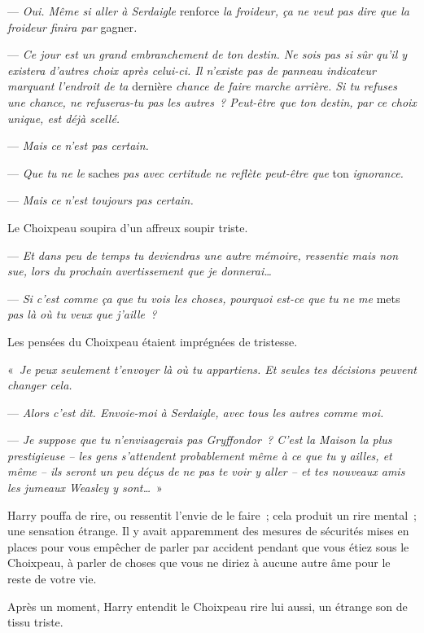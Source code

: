 --- \emph{Oui. Même si aller à Serdaigle} renforce \emph{la froideur, ça ne veut pas dire que la froideur finira par} gagner\emph{.}

--- \emph{Ce jour est un grand embranchement de ton destin. Ne sois pas si sûr qu'il y existera d'autres choix après celui-ci. Il n'existe pas de panneau indicateur marquant l'endroit de ta} dernière \emph{chance de faire marche arrière. Si tu refuses une chance, ne refuseras-tu pas les autres~? Peut-être que ton destin, par ce choix unique, est déjà scellé.}

--- \emph{Mais ce n'est pas certain.}

--- \emph{Que tu ne le} saches \emph{pas avec certitude ne reflète peut-être que} ton \emph{ignorance.}

--- \emph{Mais ce n'est toujours pas certain.}

Le Choixpeau soupira d'un affreux soupir triste.

--- \emph{Et dans peu de temps tu deviendras une autre mémoire, ressentie mais non sue, lors du prochain avertissement que je donnerai…}

--- \emph{Si c'est comme ça que tu vois les choses, pourquoi est-ce que tu ne me} mets \emph{pas là où tu veux que j'aille~?}

Les pensées du Choixpeau étaient imprégnées de tristesse.

«~\emph{Je peux seulement t'envoyer là où tu appartiens. Et seules tes décisions peuvent changer cela.}

--- \emph{Alors c'est dit. Envoie-moi à Serdaigle,  avec tous les autres comme moi.}

--- \emph{Je suppose que tu n'envisagerais pas Gryffondor~? C'est la Maison la plus prestigieuse -- les gens s'attendent probablement même à ce que tu y ailles, et même -- ils seront un peu déçus de ne pas te voir y aller -- et tes nouveaux amis les jumeaux Weasley y sont…}~»

Harry pouffa de rire, ou ressentit l'envie de le faire~; cela produit un rire mental~; une sensation étrange. Il y avait apparemment des mesures de sécurités mises en places pour vous empêcher de parler par accident pendant que vous étiez sous le Choixpeau, à parler de choses que vous ne diriez à aucune autre âme pour le reste de votre vie.

Après un moment, Harry entendit le Choixpeau rire lui aussi, un étrange son de tissu triste.

